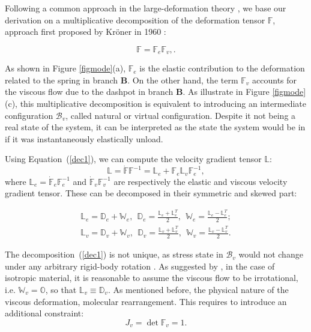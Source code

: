 \documentclass[runningheads]{llncs}
\newcommand{\F}{\ensuremath{\mathbb{F}}}
\newcommand{\LL}{\ensuremath{\mathbb{L}}}
\begin{document}
Following a common approach in the large-deformation theory \cite{Article1,CACCAVO2,Plasto,magneto,NGUYEN,growthtum}, we base our derivation on a multiplicative decomposition of the deformation tensor $\F$, approach first proposed by Kr\"{o}ner in 1960 \cite{kro}:

\begin{equation}
\F=\F_e\F_v,\label{dec1}.
\end{equation}

As shown in Figure \ref{figmode}(a), $\F_e$ is the elastic contribution to the deformation related to the spring in branch $\mathbf{B}$. On the other hand, the term $\F_v$ accounts for the viscous flow due to the dashpot in branch $\mathbf{B}$. As illustrate in Figure \ref{figmode}(c), this multiplicative decomposition is equivalent to introducing an intermediate configuration $\mathcal{B}_v$, called natural or virtual configuration. Despite it not being a real state of the system, it can be interpreted as the state the system would be in if it was instantaneously elastically unload. 

Using Equation~(\ref{dec1}), we can compute the velocity gradient tensor $\LL$:
\begin{equation}
\LL = \dot{\F}\F^{-1} = \LL_e + \F_e \LL_v \F_e^{-1},
\end{equation}
where $\LL_e=\dot{\F}_e\F_e^{-1}$ and $\dot{\F}_v\F_v^{-1}$ are respectively the elastic and viscous velocity gradient tensor. These can be decomposed in their symmetric and skewed part:

\begin{equation}
\begin{aligned}
\LL_e = \mathbb{D}_e + \mathbb{W}_e, \ \ \mathbb{D}_e = \frac{\LL_e+\LL^T_e}{2}, \ \ \mathbb{W}_e = \frac{\LL_e-\LL^T_e}{2};\\
\LL_v = \mathbb{D}_v + \mathbb{W}_v,  \ \ \mathbb{D}_v = \frac{\LL_v+\LL^T_v}{2}, \ \ \mathbb{W}_v = \frac{\LL_v-\LL^T_v}{2}.
\end{aligned}
\end{equation}

The decomposition~(\ref{dec1}) is not unique, as stress state in $\mathcal{B}_v$ would not change under any arbitrary rigid-body rotation \cite{multdec}. As suggested by \cite{Plasto}, in the case of isotropic material, it is reasonable to assume the viscous flow to be irrotational, i.e. $\mathbb{W}_v=\mathbb{O}$, so that $\LL_v \equiv \mathbb{D}_v$.
As mentioned before, the physical nature of the viscous deformation, molecular rearrangement. This requires to introduce an additional constraint:
\begin{equation}
J_v=\det \F_v= 1.\label{Jv}
\end{equation}
\end{document}
